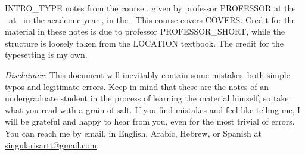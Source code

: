 INTRO_TYPE notes from the course \MyTitle, given by professor PROFESSOR at the \faculty~at \location~in the academic year \academicyear, in the \term. This course covers COVERS. Credit for the material in these notes is due to professor PROFESSOR_SHORT, while the structure is loosely taken from the LOCATION textbook. The credit for the typesetting is my own.

\textit{Disclaimer:} This document will inevitably contain some mistakes--both simple typos and legitimate errors. Keep in mind that these are the notes of an undergraduate student in the process of learning the material himself, so take what you read with a grain of salt. If you find mistakes and feel like telling me, I will be grateful and happy to hear from you, even for the most trivial of errors. You can reach me by email, in English, Arabic, Hebrew, or Spanish at \href{mailto:singularisartt@gmail.com}{singularisartt@gmail.com}.
